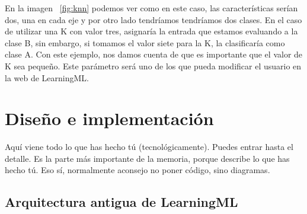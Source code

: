 \documentclass[a4paper, 12pt]{book}
\begin{document}
En la imagen  ~\ref{fig:knn} podemos ver como en este caso, las características serían dos, una en cada eje y por otro lado tendríamos tendríamos dos clases. En el caso de utilizar una K con valor tres, asignaría la entrada que estamos evaluando a la clase B, sin embargo, si tomamos el valor siete para la K, la clasificaría como clase A. Con este ejemplo, nos damos cuenta de que es importante que el valor de K sea pequeño. Este parámetro será uno de los que pueda modificar el usuario en la web de LearningML.



\cleardoublepage
\chapter{Diseño e implementación}

Aquí viene todo lo que has hecho tú (tecnológicamente). 
Puedes entrar hasta el detalle. 
Es la parte más importante de la memoria, porque describe lo que has hecho tú.
Eso sí, normalmente aconsejo no poner código, sino diagramas.

\section{Arquitectura antigua de LearningML} 
\label{sec:arquitecturaantigua}
\end{document}
